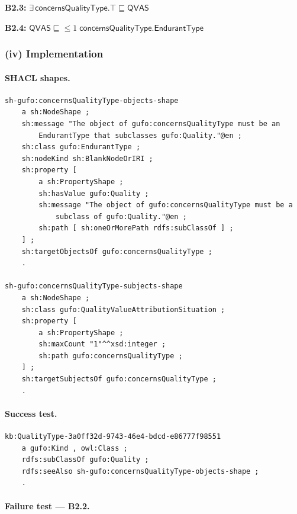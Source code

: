 \documentclass[12pt,a4paper]{article}
\begin{document}
\textbf{B2.3:}
$\exists\,\mathsf{concernsQualityType}.\top \sqsubseteq \mathsf{QVAS}$

\textbf{B2.4:}
$\mathsf{QVAS} \sqsubseteq {\leq}1\;\mathsf{concernsQualityType}.\mathsf{EndurantType}$

\subsubsection*{(iv) Implementation}

\paragraph{SHACL shapes.}

\begin{lstlisting}[style=turtlestyle]
sh-gufo:concernsQualityType-objects-shape
    a sh:NodeShape ;
    sh:message "The object of gufo:concernsQualityType must be an
        EndurantType that subclasses gufo:Quality."@en ;
    sh:class gufo:EndurantType ;
    sh:nodeKind sh:BlankNodeOrIRI ;
    sh:property [
        a sh:PropertyShape ;
        sh:hasValue gufo:Quality ;
        sh:message "The object of gufo:concernsQualityType must be a
            subclass of gufo:Quality."@en ;
        sh:path [ sh:oneOrMorePath rdfs:subClassOf ] ;
    ] ;
    sh:targetObjectsOf gufo:concernsQualityType ;
    .

sh-gufo:concernsQualityType-subjects-shape
    a sh:NodeShape ;
    sh:class gufo:QualityValueAttributionSituation ;
    sh:property [
        a sh:PropertyShape ;
        sh:maxCount "1"^^xsd:integer ;
        sh:path gufo:concernsQualityType ;
    ] ;
    sh:targetSubjectsOf gufo:concernsQualityType ;
    .
\end{lstlisting}

\paragraph{Success test.}

\begin{lstlisting}[style=turtlestyle]
kb:QualityType-3a0ff32d-9743-46e4-bdcd-e86777f98551
    a gufo:Kind , owl:Class ;
    rdfs:subClassOf gufo:Quality ;
    rdfs:seeAlso sh-gufo:concernsQualityType-objects-shape ;
    .
\end{lstlisting}

\paragraph{Failure test --- B2.2.}
\end{document}
